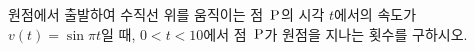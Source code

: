 \hspace*{2mm}\begin{minipage}[t]{\dimexpr\linewidth-2mm\relax}\vspace{0pt}
원점에서 출발하여 수직선 위를 움직이는 점~$\mathrm{P}$의 시각 $t$에서의 속도가 $v(t)=\sin\pi t$일 때, $0<t<10$에서 점~$\mathrm{P}$가 원점을 지나는 횟수를 구하시오.\end{minipage}
